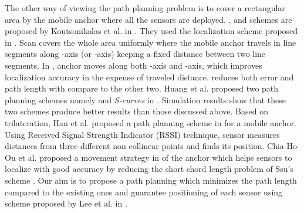 \documentclass[preprint,11pt]{elsarticle}
\begin{document}
The other way of viewing the path planning problem is to cover a rectangular area
by the mobile anchor where all the sensors are deployed.
,  and  schemes are proposed by Koutsonikolas et al. in \cite{Koutsonikolas2007}.
They used the localization scheme proposed in \cite{Sichitiu2004}. Scan covers the whole area
uniformly where the mobile anchor travels in line segments along -axis (or -axis) keeping a
fixed distance between two line segments. In , anchor moves along both -axis
and -axis, which improves localization accuracy in the expense of traveled distance.
 reduces both error and path length with compare to the other two.
Huang et al. proposed two path planning schemes namely  and {\it S-curves} in \cite{Huang2007}.
Simulation results show that these two schemes produce better results than those discussed above.
Based on trilateration, Han et al.  proposed a path planning scheme in \cite{Han2013} for a
mobile anchor. Using Received Signal Strength Indicator (RSSI) technique, sensor measures distances from three
different non collinear points and finds its position. Chia-Ho-Ou et al. proposed
a movement strategy in \cite{Chia-Ho-Ou2013} of the anchor which helps sensors to localize
with good accuracy by reducing the short chord length problem of Ssu's scheme \cite{Ssu2005}.
Our aim is to propose a path planning which minimizes the path length compared to the
existing ones and guarantee positioning of each sensor using scheme
proposed by Lee et al. in \cite{Lee2009}.
\end{document}
